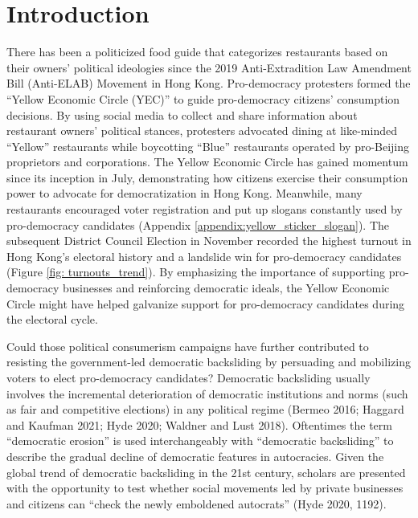\documentclass[letterpaper, 12pt]{article}
\begin{document}
\section{Introduction}
There has been a politicized food guide that categorizes restaurants based on their owners' political ideologies since the 2019 Anti-Extradition Law Amendment Bill (Anti-ELAB) Movement in Hong Kong. Pro-democracy protesters formed the ``Yellow Economic Circle (YEC)'' to guide pro-democracy citizens' consumption decisions. By using social media to collect and share information about restaurant owners' political stances, protesters advocated dining at like-minded ``Yellow'' restaurants while boycotting ``Blue'' restaurants operated by pro-Beijing proprietors and corporations. The Yellow Economic Circle has gained momentum since its inception in July, demonstrating how citizens exercise their consumption power to advocate for democratization in Hong Kong. Meanwhile, many restaurants encouraged voter registration and put up slogans constantly used by pro-democracy candidates (Appendix \ref{appendix:yellow_sticker_slogan}). The subsequent District Council Election in November recorded the highest turnout in Hong Kong's electoral history and a landslide win for pro-democracy candidates (Figure \ref{fig: turnouts_trend}). By emphasizing the importance of supporting pro-democracy businesses and reinforcing democratic ideals, the Yellow Economic Circle might have helped galvanize support for pro-democracy candidates during the electoral cycle. 


Could those political consumerism campaigns have further contributed to resisting the government-led democratic backsliding by persuading and mobilizing voters to elect pro-democracy candidates? Democratic backsliding usually involves the incremental deterioration of democratic institutions and norms (such as fair and competitive elections) in any political regime (Bermeo 2016; Haggard and Kaufman 2021; Hyde 2020; Waldner and Lust 2018). Oftentimes the term ``democratic erosion'' is used interchangeably with ``democratic backsliding'' to describe the gradual decline of democratic features in autocracies. Given the global trend of democratic backsliding in the 21st century, scholars are presented with the opportunity to test whether social movements led by private businesses and citizens can ``check the newly emboldened autocrats'' (Hyde 2020, 1192).
\end{document}
